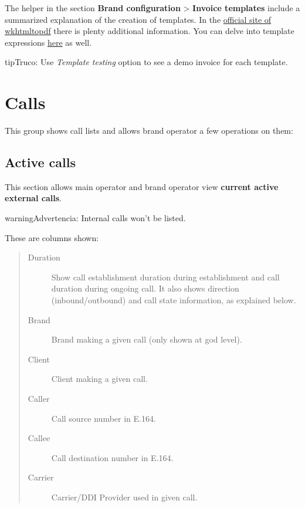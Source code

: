\documentclass[letterpaper,10pt,spanish]{sphinxmanual}
\begin{document}
The helper in the section \textbf{Brand configuration} \textgreater{} \textbf{Invoice templates} include
a summarized explanation of the creation of templates. In the \href{https://wkhtmltopdf.org/usage/wkhtmltopdf.txt}{official site of wkhtmltopdf} there is plenty additional information.
You can delve into template expressions \href{http://handlebarsjs.com/expressions.html}{here} as well.

\begin{notice}{tip}{Truco:}
Use \emph{Template testing} option to see a demo invoice for each template.
\end{notice}


\section{Calls}
\label{administration_portal/brand/calls/index::doc}\label{administration_portal/brand/calls/index:calls}
This group shows call lists and allows brand operator a few operations on them:


\subsection{Active calls}
\label{administration_portal/brand/calls/active_calls::doc}\label{administration_portal/brand/calls/active_calls:active-calls}
This section allows main operator and brand operator view \textbf{current active external calls}.

\begin{notice}{warning}{Advertencia:}
Internal calls won't be listed.
\end{notice}

These are columns shown:
\begin{quote}
\begin{description}
\item[{Duration}] \leavevmode
Show call establishment duration during establishment and call duration during ongoing call. It also shows
direction (inbound/outbound) and call state information, as explained below.

\item[{Brand}] \leavevmode
Brand making a given call (only shown at god level).

\item[{Client}] \leavevmode
Client making a given call.

\item[{Caller}] \leavevmode
Call source number in E.164.

\item[{Callee}] \leavevmode
Call destination number in E.164.

\item[{Carrier}] \leavevmode
Carrier/DDI Provider used in given call.

\end{description}
\end{quote}
\end{document}
